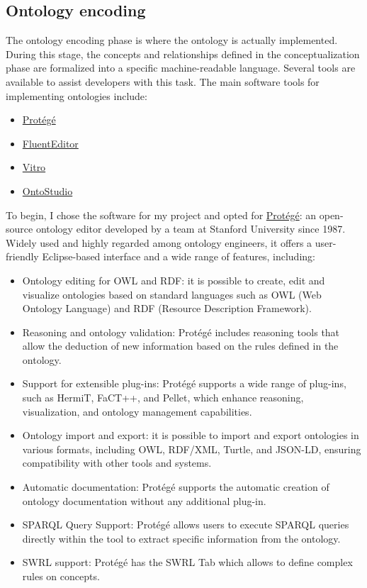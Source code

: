 \subsection{Ontology encoding}
The ontology encoding phase is where the ontology is actually implemented. During this stage, the concepts and relationships defined in the conceptualization phase are formalized into a specific machine-readable language. Several tools are available to assist developers with this task. The main software tools for implementing ontologies include:
\begin{itemize}
    \item \href{https://protege.stanford.edu/}{Protégé}
    \item \href{https://www.cognitum.eu/semantics/fluenteditor/}{FluentEditor}
    \item \href{https://github.com/vivo-project/Vitro?tab=readme-ov-file}{Vitro}
    \item \href{https://www.semafora-systems.com/ontobroker-and-ontostudio-x}{OntoStudio}
\end{itemize}
To begin, I chose the software for my project and opted for \href{https://protege.stanford.edu/}{Protégé}: an open-source ontology editor developed by a team at Stanford University since 1987. Widely used and highly regarded among ontology engineers, it offers a user-friendly Eclipse-based interface and a wide range of features, including:
\begin{itemize}
    \item Ontology editing for OWL and RDF: it is possible to create, edit and visualize ontologies based on standard languages such as OWL (Web Ontology Language) and RDF (Resource Description Framework). 
    
    \item Reasoning and ontology validation: Protégé includes reasoning tools that allow the deduction of new information based on the rules defined in the ontology.

    \item Support for extensible plug-ins: Protégé supports a wide range of plug-ins, such as HermiT, FaCT++, and Pellet, which enhance reasoning, visualization, and ontology management capabilities.

    \item Ontology import and export: it is possible to import and export ontologies in various formats, including OWL, RDF/XML, Turtle, and JSON-LD, ensuring  compatibility with other tools and systems.

    \item Automatic documentation: Protégé supports the automatic creation of ontology documentation without any additional plug-in.

    \item SPARQL Query Support: Protégé allows users to execute SPARQL queries directly within the tool to extract specific information from the ontology.

    \item SWRL support: Protégé has the SWRL Tab which allows to define complex rules on concepts.
\end{itemize}
